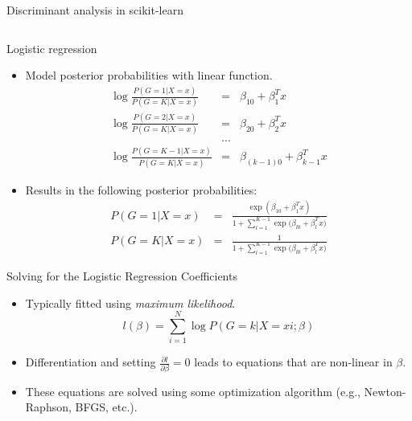 \documentclass[aspectratio=169]{beamer}
\begin{document}
\begin{frame}[fragile]{Discriminant analysis in scikit-learn}
\inputminted{python}{example_sklearn_discriminant_analysis.py}
\end{frame} 


\begin{frame}{Logistic regression}
    \begin{itemize}
        \item Model posterior probabilities with linear function.
        \begin{eqnarray*}
            \log{\frac{P(G=1|X=x)}{P(G=K|X=x)}} & = & \beta_{10} + \beta_1^T x\\
            \log{\frac{P(G=2|X=x)}{P(G=K|X=x)}} & = & \beta_{20} + \beta_2^T x\\
            & ... &\\
            \log{\frac{P(G=K-1|X=x)}{P(G=K|X=x)}} & = & \beta_{(k-1)0} + \beta_{k-1}^T x
        \end{eqnarray*}
        \item Results in the following posterior probabilities:
        \begin{eqnarray*}
            P(G=1|X=x) & = & \frac{\exp{(\beta_{10} + \beta_1^T x)}}{1 + \sum_{l=1}^{K-1}\exp{(\beta_{l0} + \beta_l^T x})}\\
            P(G=K|X=x) & = & \frac{1}{1 + \sum_{l=1}^{K-1}\exp{(\beta_{l0} + \beta_l^T x})}
        \end{eqnarray*}
    \end{itemize}
\end{frame} 


\begin{frame}{Solving for the Logistic Regression Coefficients}
    \begin{itemize}
        \item Typically fitted using \textit{maximum likelihood}.
        \begin{equation*}
            l(\beta) = \sum_{i=1}^N \log {P(G = k | X = x i; \beta)}
        \end{equation*}
        \item Differentiation and setting $\frac{\partial{l}}{\partial{\beta}} = 0$ leads to equations that are non-linear in $\beta$.
        \item These equations are solved using some optimization algorithm (e.g., Newton-Raphson, BFGS, etc.). 
    \end{itemize}
\end{frame} 
\end{document}
